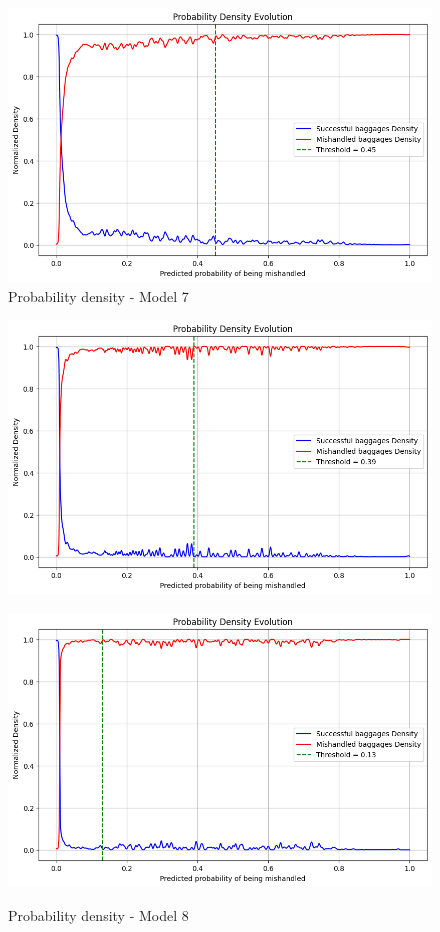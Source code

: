\documentclass[12pt]{article}
\begin{document}
\begin{figure}
\begin{minipage}[c]{0.5\linewidth}
    \includegraphics[width=1\textwidth]{Probability_density_Model 7.png}\\
    \caption{Probability density - Model 7}
\end{minipage}
\hfill
\begin{minipage}[c]{0.5\linewidth}
    \includegraphics[width=1\textwidth]{Probability_density_Model 8.png}\\
    \caption{Probability density - Model 8}
\end{minipage}%
\break
\begin{minipage}[c]{0.5\linewidth}
    \includegraphics[width=1\textwidth]{Probability_density_Model 9.png}\\

\end{minipage}
\end{figure}
\end{document}
